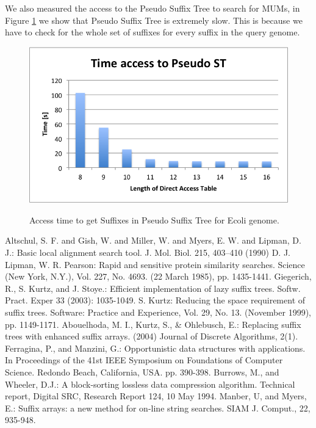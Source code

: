 \documentclass[runningheads,a4paper]{llncs}
\begin{document}
We also measured the access to the Pseudo Suffix Tree to search for MUMs, in Figure \ref{fig:pst} we show that Pseudo Suffix Tree is extremely slow. This is because we have to check for the whole set of suffixes for every suffix in the query genome.
\begin{figure}
\centering
\includegraphics[scale=0.5]{time.png}
\label{fig:pst}
\caption{Access time to get Suffixes in Pseudo Suffix Tree for Ecoli genome.}
\end{figure}
\begin{thebibliography}{8}
   Altschul, S. F. and Gish, W. and Miller, W. and Myers, E. W. and Lipman, D. J.: Basic local alignment search tool. J. Mol. Biol. 215, 403--410 (1990)
   D. J. Lipman, W. R. Pearson: Rapid and sensitive protein similarity searches. Science (New York, N.Y.), Vol. 227, No. 4693. (22 March 1985), pp. 1435-1441.
   Giegerich, R., S. Kurtz, and J. Stoye.: Efficient implementation of lazy suffix trees. Softw. Pract. Exper 33 (2003): 1035-1049.
   S. Kurtz: Reducing the space requirement of suffix trees. Software: Practice and Experience, Vol. 29, No. 13. (November 1999), pp. 1149-1171.
   Abouelhoda, M. I., Kurtz, S., \& Ohlebusch, E.: Replacing suffix trees with enhanced suffix arrays. (2004) Journal of Discrete Algorithms, 2(1).
   Ferragina, P., and Manzini, G.: Opportunistic data structures with applications. In Proceedings of the 41st IEEE Symposium on Foundations of Computer Science. Redondo Beach, California, USA. pp. 390-398.
   Burrows, M., and Wheeler, D.J.: A block-sorting lossless data compression algorithm. Technical report, Digital SRC, Research Report 124, 10 May 1994.
   Manber, U, and Myers, E.: Suffix arrays: a new method for on-line string searches. SIAM J. Comput., 22, 935-948.
\end{thebibliography}
\end{document}
